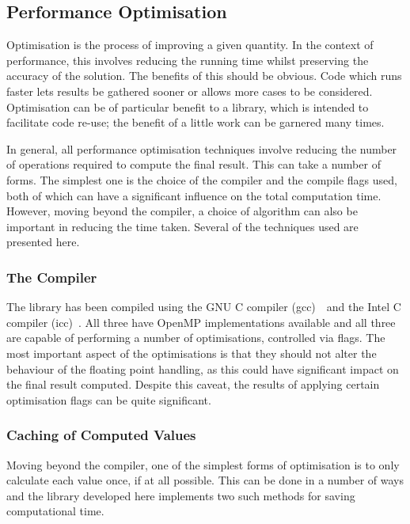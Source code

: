 \subsection{Performance Optimisation}

Optimisation is the process of improving a given quantity.
In the context of performance, this involves reducing the running time whilst
preserving the accuracy of the solution.
The benefits of this should be obvious.
Code which runs faster lets results be gathered sooner or allows more cases to
be considered.
Optimisation can be of particular benefit to a library, which is intended to
facilitate code re-use; the benefit of a little work can be garnered many
times.

In general, all performance optimisation techniques involve reducing the number
of operations required to compute the final result.
This can take a number of forms.
The simplest one is the choice of the compiler and the compile flags used, both
of which can have a significant influence on the total computation time.
However, moving beyond the compiler, a choice of algorithm can also be important
in reducing the time taken.
Several of the techniques used are presented here.

\subsubsection{The Compiler}

The library has been compiled using the GNU C compiler (gcc)~\cite{gcc}\ and the
Intel C compiler (icc)~\cite{icc}.
All three have OpenMP implementations available and all three are capable of
performing a number of optimisations, controlled via flags.
The most important
aspect of the
optimisations is that they should not alter the behaviour of the floating point
handling, as this could have significant impact on the final result computed.
Despite this caveat, the results of applying certain optimisation flags can be
quite significant.

\subsubsection{Caching of Computed Values}

Moving beyond the compiler, one of the simplest forms of optimisation is to only
calculate each value once, if at all possible.  This can be done in a number of
ways and the library developed here implements two such methods for saving
computational time.

